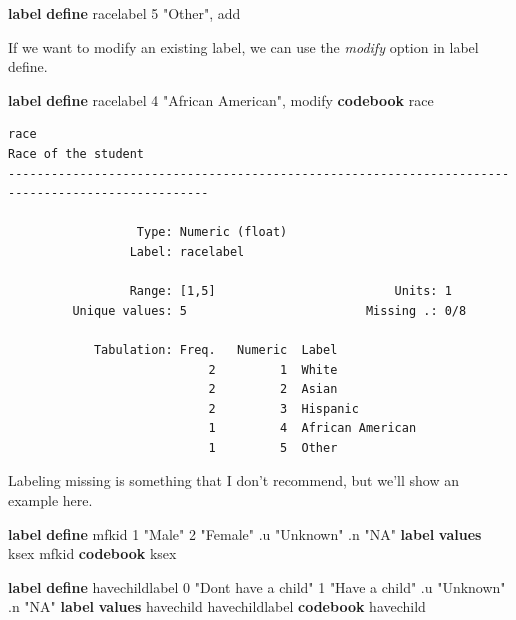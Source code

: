 \documentclass[
]{book}
\newenvironment{Shaded}{\begin{snugshade}}{\end{snugshade}}
\newcommand{\KeywordTok}[1]{\textcolor[rgb]{0.13,0.29,0.53}{\textbf{#1}}}
\newcommand{\NormalTok}[1]{#1}
\newcommand{\StringTok}[1]{\textcolor[rgb]{0.31,0.60,0.02}{#1}}
\begin{document}
\begin{Shaded}
\begin{Highlighting}[]
\KeywordTok{label} \KeywordTok{define}\NormalTok{ racelabel 5 }\StringTok{"Other"}\NormalTok{, add}
\end{Highlighting}
\end{Shaded}

If we want to modify an existing label, we can use the \emph{modify} option in label define.

\begin{Shaded}
\begin{Highlighting}[]
\KeywordTok{label} \KeywordTok{define}\NormalTok{ racelabel 4 }\StringTok{"African American"}\NormalTok{, modify}
\KeywordTok{codebook}\NormalTok{ race}
\end{Highlighting}
\end{Shaded}

\begin{verbatim}
race                                                                           Race of the student
--------------------------------------------------------------------------------------------------

                  Type: Numeric (float)
                 Label: racelabel

                 Range: [1,5]                         Units: 1
         Unique values: 5                         Missing .: 0/8

            Tabulation: Freq.   Numeric  Label
                            2         1  White
                            2         2  Asian
                            2         3  Hispanic
                            1         4  African American
                            1         5  Other
\end{verbatim}

Labeling missing is something that I don't recommend, but we'll show an example here.

\begin{Shaded}
\begin{Highlighting}[]
\KeywordTok{label} \KeywordTok{define}\NormalTok{ mfkid 1 }\StringTok{"Male"}\NormalTok{ 2 }\StringTok{"Female"}\NormalTok{ .u }\StringTok{"Unknown"}\NormalTok{ .n }\StringTok{"NA"}
\KeywordTok{label} \KeywordTok{values}\NormalTok{ ksex mfkid}
\KeywordTok{codebook}\NormalTok{ ksex}

\KeywordTok{label} \KeywordTok{define}\NormalTok{ havechildlabel 0 }\StringTok{"Don\textquotesingle{}t have a child"}\NormalTok{ 1 }\StringTok{"Have a child"}\NormalTok{ .u }\StringTok{"Unknown"}\NormalTok{ .n }\StringTok{"NA"}
\KeywordTok{label} \KeywordTok{values}\NormalTok{ havechild havechildlabel}
\KeywordTok{codebook}\NormalTok{ havechild}
\end{Highlighting}
\end{Shaded}
\end{document}
